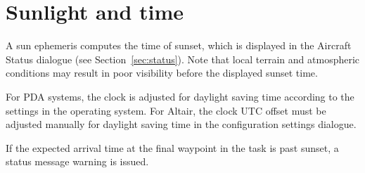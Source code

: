 \section{Sunlight and time}

A sun ephemeris computes the time of sunset, which is displayed in the
Aircraft Status dialogue (see Section~\ref{sec:status}).  Note that
local terrain and atmospheric conditions may result in poor visibility
before the displayed sunset time.

For PDA systems, the clock is adjusted for daylight saving time according
to the settings in the operating system.  For Altair, the clock UTC offset
must be adjusted manually for daylight saving time in the configuration
settings dialogue.

If the expected arrival time at the final waypoint in the task is past
sunset, a status message warning is issued.
